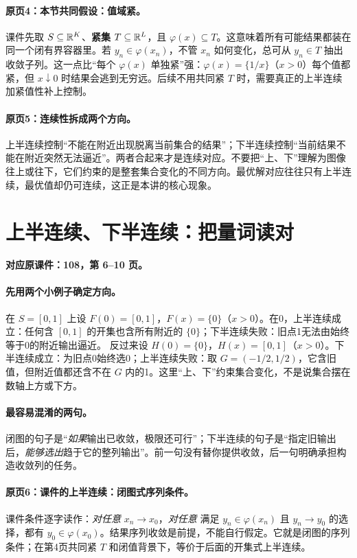 \paragraph{原页4：本节共同假设：值域紧。}课件先取 $S\subseteq\mathbb{R}^K$、\textbf{紧集} $T\subseteq\mathbb{R}^L$，且 $\varphi(x)\subseteq T$。这意味着所有可能结果都装在同一个闭有界容器里。若 $y_n\in\varphi(x_n)$，不管 $x_n$ 如何变化，总可从 $y_n\in T$ 抽出收敛子列。这一点比“每个 $\varphi(x)$ 单独紧”强：$\varphi(x)=\{1/x\}$（$x>0$）每个值都紧，但 $x\downarrow0$ 时结果会逃到无穷远。后续不用共同紧 $T$ 时，需要真正的上半连续加紧值性补上控制。



\paragraph{原页5：连续性拆成两个方向。}上半连续控制“不能在附近出现脱离当前集合的结果”；下半连续控制“当前结果不能在附近突然无法逼近”。两者合起来才是连续对应。不要把“上、下”理解为图像往上或往下，它们约束的是整套集合变化的不同方向。最优解对应往往只有上半连续，最优值却仍可连续，这正是本讲的核心现象。



\clearpage\section{上半连续、下半连续：把量词读对}\label{g:108:6}

\textbf{对应原课件：108，第 6--10 页。}


\paragraph{先用两个小例子确定方向。}
在 $S=[0,1]$ 上设 $F(0)=[0,1]$，$F(x)=\{0\}$（$x>0$）。在0，上半连续成立：任何含 $[0,1]$ 的开集也含所有附近的 $\{0\}$；下半连续失败：旧点1无法由始终等于0的附近输出逼近。
反过来设 $H(0)=\{0\}$，$H(x)=[0,1]$（$x>0$）。下半连续成立：为旧点0始终选0；上半连续失败：取 $G=(-1/2,1/2)$，它含旧值，但附近值都还含不在 $G$ 内的1。这里“上、下”约束集合变化，不是说集合摆在数轴上方或下方。
\paragraph{最容易混淆的两句。}
闭图的句子是“\emph{如果}输出已收敛，极限还可行”；下半连续的句子是“指定旧输出后，\emph{能够选出}趋于它的整列输出”。前一句没有替你提供收敛，后一句明确承担构造收敛列的任务。


\paragraph{原页6：课件的上半连续：闭图式序列条件。}课件条件逐字读作：\emph{对任意} $x_n\to x_0$，\emph{对任意} 满足 $y_n\in\varphi(x_n)$ 且 $y_n\to y_0$ 的选择，都有 $y_0\in\varphi(x_0)$。结果序列收敛是前提，不能自行假定。它就是闭图的序列条件；在第4页共同紧 $T$ 和闭值背景下，等价于后面的开集式上半连续。

